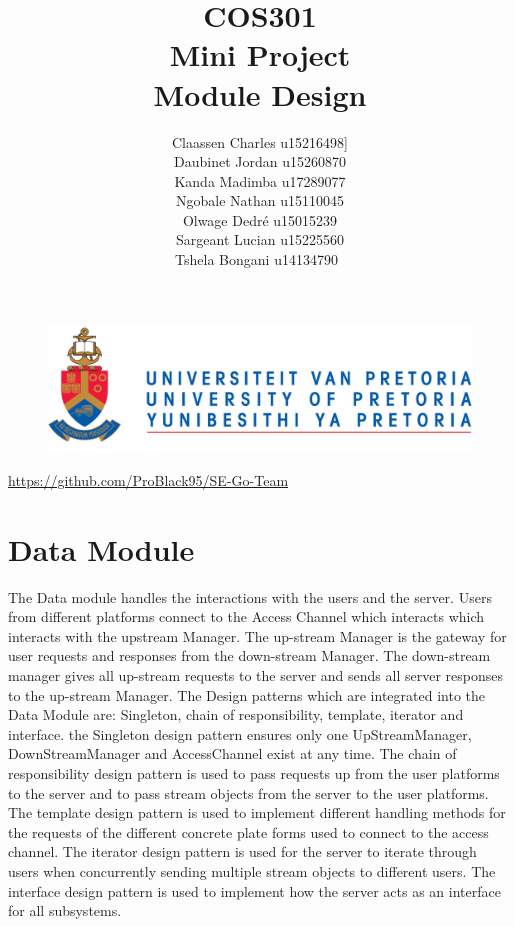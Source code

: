 \documentclass[12pt]{article}
\begin{document}
	

	\begin{figure}
		\includegraphics[width=\linewidth]{logo.jpg}	
	\end{figure}

	\title 	{
				COS301\\
				Mini Project\\
				Module Design
		}
	\author {
				Claassen Charles u15216498]\\
                Daubinet Jordan u15260870\\
                Kanda Madimba u17289077\\
                Ngobale Nathan u15110045\\
                Olwage Dedré u15015239\\
                Sargeant Lucian u15225560\\
                Tshela Bongani u14134790\
		}
	\maketitle
	\begin{center}
			\url{https://github.com/ProBlack95/SE-Go-Team}	
	\end{center}
	\newpage
	\tableofcontents
	
	\newpage
		
	\section{Data Module}
	The Data module handles the interactions with the users and the server. Users from different platforms connect to the Access Channel which interacts which interacts with the upstream Manager. The up-stream Manager is the gateway for user requests and responses from the down-stream Manager. The down-stream manager gives all up-stream requests to the server and sends all server responses to the up-stream Manager. The Design patterns which are integrated into the Data Module are: Singleton, chain of responsibility, template, iterator and interface. the Singleton design pattern ensures only one UpStreamManager, DownStreamManager and AccessChannel exist at any time. The chain of responsibility design pattern is used to pass requests up from the user platforms to the server and to pass stream objects from the server to the user platforms. The template design pattern is used to implement different handling methods for the requests of the different concrete plate forms used to connect to the access channel. The iterator design pattern is used for the server to iterate through users when concurrently sending multiple stream objects to different users. The interface design pattern is used to implement how the server acts as an interface for all subsystems.
	
\end{document}
